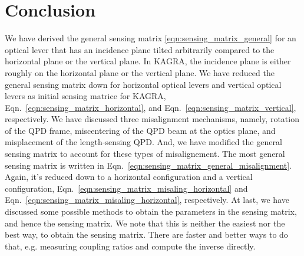 \section{Conclusion}
We have derived the general sensing matrix \eqref{eqn:sensing_matrix_general} for an optical lever that has an incidence plane tilted arbitrarily compared to the horizontal plane or the vertical plane.
In KAGRA, the incidence plane is either roughly on the horizontal plane or the vertical plane.
We have reduced the general sensing matrix down for horizontal optical levers and vertical optical levers as initial sensing matrice for KAGRA, Eqn.~\eqref{eqn:sensing_matrix_horizontal}, and Eqn.~\eqref{eqn:sensing_matrix_vertical}, respectively.
We have discussed three misalignment mechanisms, namely, rotation of the QPD frame, miscentering of the QPD beam at the optics plane, and misplacement of the length-sensing QPD.
And, we have modified the general sensing matrix to account for these types of misalignement.
The most general sensing matrix is written in Eqn.~\eqref{eqn:sensing_matrix_general_misalignment}.
Again, it's reduced down to a horizontal configuration and a vertical configuration, Eqn.~\eqref{eqn:sensing_matrix_misaling_horizontal} and Eqn.~\eqref{eqn:sensing_matrix_misaling_horizontal}, respectively.
At last, we have discussed some possible methods to obtain the parameters in the sensing matrix, and hence the sensing matrix.
We note that this is neither the easiest nor the best way, to obtain the sensing matrix.
There are faster and better ways to do that, e.g. measuring coupling ratios and compute the inverse directly.